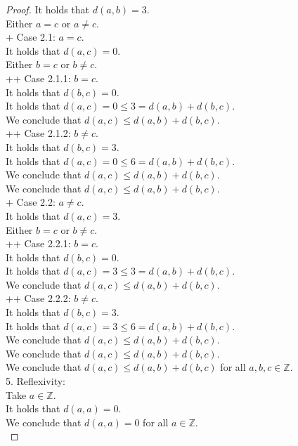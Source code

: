 \documentclass{article}
\newcommand\tab[1][1cm]{\hspace*{#1}}
\theoremstyle{mytheoremstyle}
\theoremstyle{mytheoremstyle}
\theoremstyle{myproblemstyle}
\begin{document}
\begin{proof}
        \tab It holds that $d(a,b) = 3$. \\
        \tab Either $a = c$ or $a \ne c$. \\
        \tab + Case 2.1: $a = c$. \\
        \tab \tab It holds that $d(a,c) = 0$. \\
        \tab \tab Either $b = c$ or $b \ne c$. \\
        \tab \tab \tab ++ Case 2.1.1: $b = c$. \\
        \tab \tab \tab \tab It holds that $d(b,c) = 0$. \\
        \tab \tab \tab \tab It holds that $d(a,c) = 0 \leq 3 = d(a,b) + d(b,c)$. \\
        \tab \tab \tab \tab We conclude that $d(a,c) \leq d(a,b) + d(b,c)$. \\
        \tab \tab \tab ++ Case 2.1.2: $b \ne c$. \\
        \tab \tab \tab \tab It holds that $d(b,c) = 3$. \\
        \tab \tab \tab \tab It holds that $d(a,c) = 0 \leq 6 = d(a,b) + d(b,c)$. \\
        \tab \tab \tab \tab We conclude that $d(a,c) \leq d(a,b) + d(b,c)$. \\
        \tab \tab We conclude that $d(a,c) \leq d(a,b) + d(b,c)$. \\
        \tab + Case 2.2: $a \ne c$. \\
        \tab \tab It holds that $d(a,c) = 3$. \\
        \tab \tab Either $b = c$ or $b \ne c$. \\
        \tab \tab \tab ++ Case 2.2.1: $b = c$. \\
        \tab \tab \tab \tab It holds that $d(b,c) = 0$. \\
        \tab \tab \tab \tab It holds that $d(a,c) = 3 \leq 3 = d(a,b) + d(b,c)$. \\
        \tab \tab \tab \tab We conclude that $d(a,c) \leq d(a,b) + d(b,c)$. \\
        \tab \tab \tab ++ Case 2.2.2: $b \ne c$. \\
        \tab \tab \tab \tab It holds that $d(b,c) = 3$. \\
        \tab \tab \tab \tab It holds that $d(a,c) = 3 \leq 6 = d(a,b) + d(b,c)$. \\
        \tab \tab \tab \tab We conclude that $d(a,c) \leq d(a,b) + d(b,c)$. \\
        \tab \tab We conclude that $d(a,c) \leq d(a,b) + d(b,c)$. \\
        We conclude that $d(a,c) \leq d(a,b) + d(b,c)$ for all $a,b,c \in \mathbb{Z}$. \\

        5. Reflexivity: \\
        Take $a \in \mathbb{Z}$. \\
        It holds that $d(a,a) = 0$. \\
        We conclude that $d(a,a) = 0$ for all $a \in \mathbb{Z}$. \\
    \end{proof}
    
\end{document}
